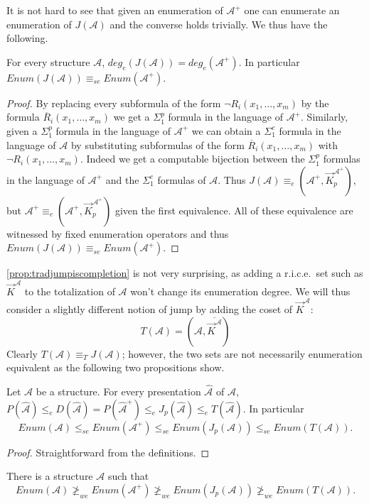 \documentclass[11pt]{amsart}
\newcommand{\A}{{\mathcal{A}}}
\renewcommand{\bar}[1]{\overline{#1}}
\begin{document}
It is not hard to see that given an enumeration of $\A^+$ one can enumerate an enumeration of $J(\A)$ and the converse holds trivially. We thus have the following.
\begin{proposition}\label{prop:tradjumpiscompletion}
    For every structure $\A$, $deg_e(J(\A))=deg_e(\A^+)$. In particular $Enum(J(\A))\equiv_{se} Enum(\A^+)$.
\end{proposition}
\begin{proof}
By replacing every subformula of the form $\neg R_i(x_1,\dots, x_m)$ by the formula $\bar R_i(x_1,\dots,x_m)$ we get a $\Sigma^p_1$ formula in the language of $\A^+$. Similarly, given a $\Sigma^p_1$ formula in the language of $\A^+$ we can obtain a $\Sigma^c_1$ formula in the language of $\A$ by substituting subformulas of the form $\bar R_i(x_1,\dots,x_m)$ with $\neg R_i(x_1,\dots,x_m)$. Indeed we get a computable bijection between the $\Sigma^p_1$ formulas in the language of $\A^+$ and the $\Sigma^c_1$ formulas of $\A$. Thus $J(\A)\equiv_e (\A^+,\vec K_p^{\A^+})$, but $\A^+\equiv_e (\A^+,\vec K_p^{\A^+})$ given the first equivalence. All of these equivalence are witnessed by fixed enumeration operators and thus $Enum(J(\A))\equiv_{se} Enum(\A^+)$.
\end{proof}
\cref{prop:tradjumpiscompletion} is not very surprising, as adding a r.i.c.e.\ set such as $\vec{K}^\A$ to the totalization of $\A$ won't change its enumeration degree. We will thus consider a slightly different notion of jump by adding the coset of $\vec{K}^\A$:
\[ T(\A)=(\A,\overline{\vec{K}^{\A}})\]
Clearly $T(\A)\equiv_T J(\A)$; however, the two sets are not necessarily enumeration equivalent as the following two propositions show.
\begin{proposition}
    Let $\A$ be a structure. For every presentation $\hat \A$ of $\A$, $P(\hat \A)\leq_e D(\hat\A)=P(\hat\A^+)\leq_e J_p(\hat\A)\leq_e T(\hat\A)$. In particular 
    \[Enum(\A)\leq_{se}Enum(\A^+)\leq_{se} Enum(J_p(\A))\leq_{se} Enum(T(\A)).\]
\end{proposition}
\begin{proof}
Straightforward from the definitions.
\end{proof}
\begin{proposition}
There is a structure $\A$ such that \[Enum(\A)\not\geq_{we}Enum(\A^+)\not\geq_{we} Enum(J_p(\A))\not\geq_{we}Enum(T(\A)).\]
\end{proposition}
\end{document}
